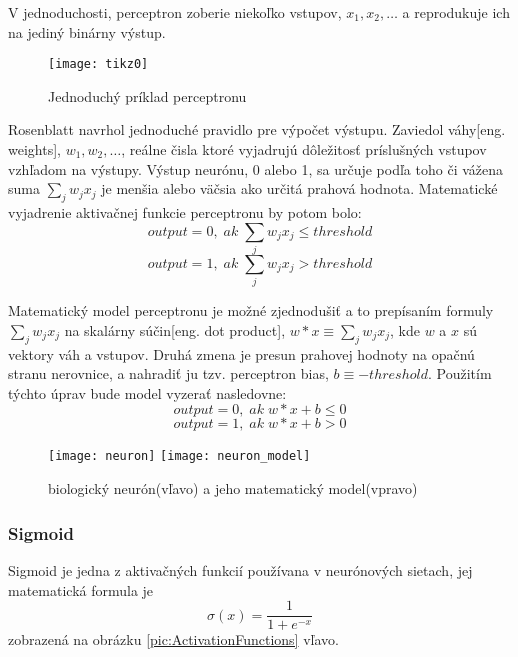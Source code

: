 V jednoduchosti, perceptron zoberie niekoľko vstupov, $x_1, x_2, \dots$ a reprodukuje ich na jediný binárny výstup.
\begin{figure}[H]
	\centering
	\texttt{[image: tikz0]}
	\caption{Jednoduchý príklad perceptronu\cite{odkaz:HandwrittenDigitRecognision}}
	\label{pic:Perceptron}
\end{figure}
Rosenblatt navrhol jednoduché pravidlo pre výpočet výstupu.
Zaviedol váhy[eng. weights], $w_1, w_2, \dots$,
    reálne čisla ktoré vyjadrujú dôležitosť príslušných vstupov vzhľadom na výstupy.
Výstup neurónu, 0 alebo 1, sa určuje podľa toho či vážena suma $\sum_j w_j x_j$ je menšia alebo väčsia ako určitá prahová hodnota.
Matematické vyjadrenie aktivačnej funkcie perceptronu by potom bolo\cite{odkaz:HandwrittenDigitRecognision}:
\begin{equation}
    output = 0, \; ak \; \sum_j w_j x_j \leq threshold
\end{equation}
\begin{equation}
    output = 1, \; ak \; \sum_j w_j x_j > threshold
\end{equation}

Matematický model perceptronu je možné zjednodušiť a to prepísaním formuly $\sum_j w_j x_j$ na skalárny súčin[eng. dot product],
    $w*x \equiv \sum_j w_j x_j$, kde $w$ a $x$ sú vektory váh a vstupov.
Druhá zmena je presun prahovej hodnoty na opačnú stranu nerovnice, a nahradiť ju tzv. perceptron bias, $b \equiv -threshold$.
Použitím týchto úprav bude model vyzerať nasledovne\cite{odkaz:HandwrittenDigitRecognision}:
\begin{equation}
    output = 0, \; ak \; w*x + b \leq 0
\end{equation}
\begin{equation}
    output = 1, \; ak \; w*x + b > 0
\end{equation}

\begin{figure}[H]
    \centering
    \texttt{[image: neuron]}
    \qquad
    \texttt{[image: neuron\_model]}
    \caption{biologický neurón(vľavo) a jeho matematický model(vpravo)\cite{odkaz:ConvolutionalNeuralNetworkCS231n}}
    \label{pic:Neuron}
\end{figure}

\subsubsection{Sigmoid}
Sigmoid je jedna z aktivačných funkcií používana v neurónových sietach, jej matematická formula je
\begin{equation}
    \sigma(x) = \frac{1}{1 + e^{-x}}
\end{equation}
zobrazená na obrázku \ref{pic:ActivationFunctions} vľavo.

